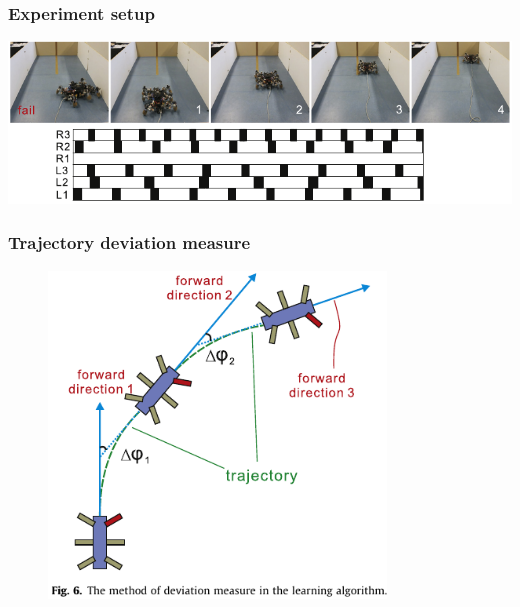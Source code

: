 \documentclass{beamer}
\begin{document}
\begin{frame}
\frametitle{Experiment setup}
\hspace*{-0.4cm}
\includegraphics[width=1.1\textwidth]{figs/real-experiments-cropped.pdf}
\end{frame}

\begin{frame}
\frametitle{Trajectory deviation measure}
\begin{figure}
\center
\includegraphics[width=0.8\textwidth]{figs/deviation-measure.pdf}
\end{figure}
\end{frame}
\end{document}
